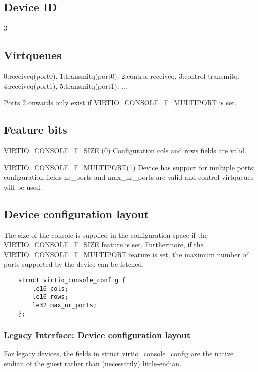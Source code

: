 \subsection{Device ID}\label{sec:Device Types / Console Device / Device ID}

  3

\subsection{Virtqueues}\label{sec:Device Types / Console Device / Virtqueues}

   0:receiveq(port0). 1:transmitq(port0), 2:control receiveq, 3:control transmitq, 4:receiveq(port1), 5:transmitq(port1),
  ...

  Ports 2 onwards only exist if VIRTIO_CONSOLE_F_MULTIPORT is set.

\subsection{Feature bits}\label{sec:Device Types / Console Device / Feature bits}

  VIRTIO_CONSOLE_F_SIZE (0) Configuration cols and rows fields
    are valid.

  VIRTIO_CONSOLE_F_MULTIPORT(1) Device has support for multiple
    ports; configuration fields nr_ports and max_nr_ports are
    valid and control virtqueues will be used.

\subsection{Device configuration layout}\label{sec:Device Types / Console Device / Device configuration layout}

  The size of the console is supplied
  in the configuration space if the VIRTIO_CONSOLE_F_SIZE feature
  is set. Furthermore, if the VIRTIO_CONSOLE_F_MULTIPORT feature
  is set, the maximum number of ports supported by the device can
  be fetched.

\begin{lstlisting}
	struct virtio_console_config {
		le16 cols;
		le16 rows;
		le32 max_nr_ports;
	};
\end{lstlisting}

\subsubsection{Legacy Interface: Device configuration layout}\label{sec:Device Types / Console Device / Device configuration layout / Legacy Interface: Device configuration layout}
For legacy devices, the fields in struct virtio_console_config are the
native endian of the guest rather than (necessarily) little-endian.

